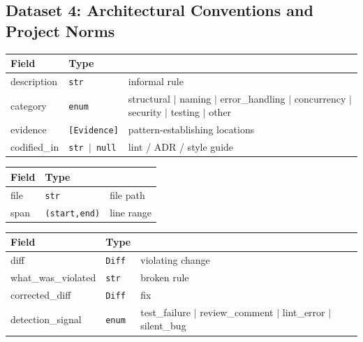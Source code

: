 \documentclass[a4paper,12pt]{article}
\begin{document}
\subsection{Dataset 4: Architectural Conventions and Project Norms}

\begin{tcolorbox}[title=Convention]
\footnotesize
\begin{tabularx}{\linewidth}{@{} l l Y @{}}
\toprule
\textbf{Field} & \textbf{Type} & \\
\midrule
description & \texttt{str} & informal rule \\
category & \texttt{enum} & structural $\mid$ naming $\mid$ error\_handling $\mid$ concurrency $\mid$ security $\mid$ testing $\mid$ other \\
evidence & \texttt{[Evidence]} & pattern-establishing locations \\
codified\_in & \texttt{str $\mid$ null} & lint / ADR / style guide \\
\bottomrule
\end{tabularx}
\end{tcolorbox}

\begin{tcolorbox}[title=Evidence]
\footnotesize
\begin{tabularx}{\linewidth}{@{} l l Y @{}}
\toprule
\textbf{Field} & \textbf{Type} & \\
\midrule
file & \texttt{str} & file path \\
span & \texttt{(start,end)} & line range \\
\bottomrule
\end{tabularx}
\end{tcolorbox}

\begin{tcolorbox}[title=Violation]
\footnotesize
\begin{tabularx}{\linewidth}{@{} l l Y @{}}
\toprule
\textbf{Field} & \textbf{Type} & \\
\midrule
diff & \texttt{Diff} & violating change \\
what\_was\_violated & \texttt{str} & broken rule \\
corrected\_diff & \texttt{Diff} & fix \\
detection\_signal & \texttt{enum} & test\_failure $\mid$ review\_comment $\mid$ lint\_error $\mid$ silent\_bug \\
\bottomrule
\end{tabularx}
\end{tcolorbox}
\end{document}
